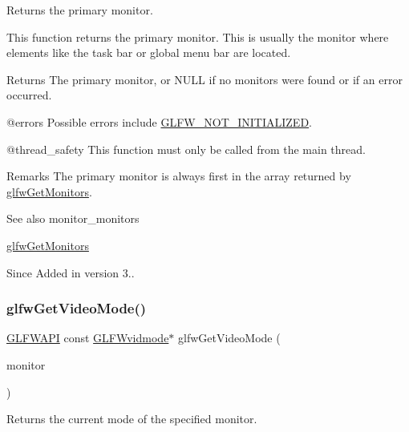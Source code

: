 Returns the primary monitor. 

This function returns the primary monitor. This is usually the monitor where elements like the task bar or global menu bar are located.

\begin{DoxyReturn}{Returns}
The primary monitor, or {\ttfamily N\+U\+LL} if no monitors were found or if an error occurred.
\end{DoxyReturn}
@errors Possible errors include \mbox{\hyperlink{group__errors_ga2374ee02c177f12e1fa76ff3ed15e14a}{G\+L\+F\+W\+\_\+\+N\+O\+T\+\_\+\+I\+N\+I\+T\+I\+A\+L\+I\+Z\+ED}}.

@thread\+\_\+safety This function must only be called from the main thread.

\begin{DoxyRemark}{Remarks}
The primary monitor is always first in the array returned by \mbox{\hyperlink{group__monitor_gab4d483284c57e28837bc2cd9639e9665}{glfw\+Get\+Monitors}}.
\end{DoxyRemark}
\begin{DoxySeeAlso}{See also}
monitor\+\_\+monitors 

\mbox{\hyperlink{group__monitor_gab4d483284c57e28837bc2cd9639e9665}{glfw\+Get\+Monitors}}
\end{DoxySeeAlso}
\begin{DoxySince}{Since}
Added in version 3.. 
\end{DoxySince}
\mbox{\label{group__monitor_gac234b63ec525c70d7e18ac84aca088c6}} 
\subsubsection{\texorpdfstring{glfwGetVideoMode()}{glfwGetVideoMode()}}
{\footnotesize\ttfamily \mbox{\hyperlink{glfw3_8h_a56da5036b2cc259351ae22fd6439bb47}{G\+L\+F\+W\+A\+PI}} const \mbox{\hyperlink{struct_g_l_f_wvidmode}{G\+L\+F\+Wvidmode}}$\ast$ glfw\+Get\+Video\+Mode (\begin{DoxyParamCaption}\item[{\mbox{\hyperlink{group__monitor_ga8d9efd1cde9426692c73fe40437d0ae3}{G\+L\+F\+Wmonitor}} $\ast$}]{monitor }\end{DoxyParamCaption})}



Returns the current mode of the specified monitor. 

